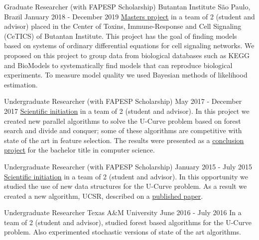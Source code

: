 \documentclass[11pt, a4paper]{awesome-cv-res}
\begin{document}
\begin{cventries}
\cventry
{Graduate Researcher (with FAPESP Scholarship)}
{Butantan Institute}
{São Paulo, Brazil}
{January 2018 - December 2019}
{\href{https://bv.fapesp.br/en/bolsas/175684/identification-of-cell-signaling-pathways-based-on-biochemical-reaction-kinetics-repositories/}
{\color{awesome}\underline {Masters project}} in a team of 2 (student 
    and advisor) placed in the Center of Toxins, Immune-Response and 
    Cell Signaling (CeTICS) of Butantan Institute. This project has the 
    goal of finding models based on systems of ordinary differential 
    equations for cell signaling networks. We proposed on this project 
    to group data from biological databases such as KEGG and BioModels 
    to systematically find models that can reproduce biological 
    experiments. To measure model quality we used Bayesian methods of 
    likelihood estimation.}

\cventry
{Undergraduate Researcher (with FAPESP Scholarship)}
{}
{}
{May 2017 - December 2017}
{\href{https://bv.fapesp.br/en/bolsas/170553/design-of-poset-forest-based-algorithms-for-the-u-curve-optimization-problem/}
{\color{awesome} \underline{Scientific initiation}} in a team of 2 
    (student and advisor). In this project we created new parallel 
    algorithms to solve the U-Curve problem based on forest search and 
    divide and conquer; some of these algorithms are competitive with 
    state of the art in feature selection. The results were presented 
    as a \href{http://linux.ime.usp.br/~gustavoem/mac0499}
    {\color{awesome} \underline{conclusion project}} for the bachelor 
    title in computer science.}

\cventry
{Undergraduate Researcher (with FAPESP Scholarship)}
{}
{}
{January 2015 - July 2015}
{\href{https://bv.fapesp.br/en/bolsas/156441/studies-of-efficient-data-structures-to-tackle-the-u-curve-optimization-problem/}
{\color{awesome} \underline{Scientific initiation}} in a team of 2 
    (student and advisor). In this opportunity we studied the use of new 
    data structures for the U-Curve problem. As a result we created a 
    new algorithm, UCSR, described on a \href{https://www.sciencedirect.com/science/article/pii/S0020025518306789?via\%3Dihub}
    {published paper}.}


\cventry
{Undergraduate Researcher}
{Texas A\&M University}
{}
{June 2016 - July 2016}
{In a team of 2 (student and advisor), studied forest based algorithms
for the U-Curve problem. Also experimented stochastic versions of state
    of the art algorithms.}
\end{cventries}
\end{document}
